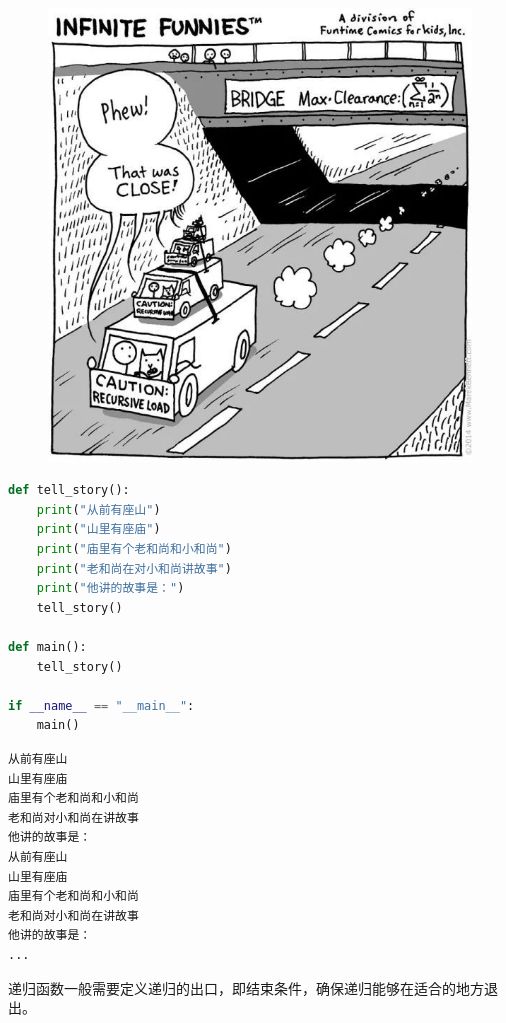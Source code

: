 \begin{figure}[H]
	\centering
	\includegraphics[scale=0.6]{img/C5/5-5/5.png}
\end{figure}


\begin{lstlisting}[language=Python]
def tell_story():
	print("从前有座山")
	print("山里有座庙")
	print("庙里有个老和尚和小和尚")
	print("老和尚在对小和尚讲故事")
	print("他讲的故事是：")
	tell_story()

def main():
	tell_story()

if __name__ == "__main__":
	main()
\end{lstlisting}

\begin{tcolorbox}
	\begin{verbatim}
从前有座山
山里有座庙
庙里有个老和尚和小和尚
老和尚对小和尚在讲故事
他讲的故事是：
从前有座山
山里有座庙
庙里有个老和尚和小和尚
老和尚对小和尚在讲故事
他讲的故事是：
...
\end{verbatim}
\end{tcolorbox}

递归函数一般需要定义递归的出口，即结束条件，确保递归能够在适合的地方退出。\\

